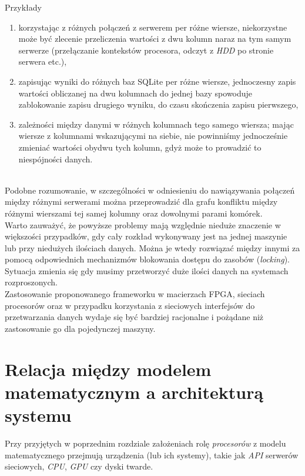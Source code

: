 \documentclass[brudnopis]{xmgr}
\begin{document}
Przykłady
\begin{enumerate}
    \item korzystając z różnych połączeń z serwerem per różne wiersze, niekorzystne może być zlecenie przeliczenia wartości z dwu kolumn naraz na tym samym serwerze (przełączanie kontekstów procesora, odczyt z \emph{HDD} po stronie serwera etc.),
    \item zapisując wyniki do różnych baz SQLite per różne wiersze, jednoczesny zapis wartości obliczanej na dwu kolumnach do jednej bazy spowoduje zablokowanie zapisu drugiego wyniku, do czasu skończenia zapisu pierwszego,
    \item zależności między danymi w różnych kolumnach tego samego wiersza; mając wiersze z kolumnami wskazującymi na siebie, nie powinniśmy jednocześnie zmieniać wartości obydwu tych kolumn, gdyż może to prowadzić to niespójności danych.
\end{enumerate}
\medskip\\

Podobne rozumowanie, w szczególności w odniesieniu do nawiązywania połączeń między różnymi serwerami można przeprowadzić dla grafu konfliktu między różnymi wierszami tej samej kolumny oraz dowolnymi parami komórek.
\medskip\\

Warto zauważyć, że powyższe problemy mają względnie nieduże znaczenie w większości przypadków, gdy cały rozkład wykonywany jest na jednej maszynie lub przy niedużych ilościach danych. Można je wtedy rozwiązać między innymi za pomocą odpowiednich mechanizmów blokowania dostępu do zasobów (\emph{locking}).
Sytuacja zmienia się gdy musimy przetworzyć duże ilości danych na systemach rozproszonych.
\medskip\\

Zastosowanie proponowanego frameworku w macierzach FPGA, sieciach procesorów oraz w przypadku korzystania z sieciowych interfejsów do przetwarzania danych wydaje się być bardziej racjonalne i pożądane niż zastosowanie go dla pojedynczej maszyny.

\chapter{Relacja między modelem matematycznym a architekturą systemu}

Przy przyjętych w poprzednim rozdziale założeniach rolę \emph{procesorów} z modelu matematycznego przejmują urządzenia (lub ich systemy), takie jak \emph{API} serwerów sieciowych, \emph{CPU}, \emph{GPU} czy dyski twarde.
\medskip\\
\end{document}

